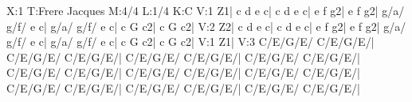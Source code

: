 X:1
T:Frere Jacques
M:4/4
L:1/4
K:C
V:1
Z1|
c d e c| c d e c| e f g2| e f g2| g/a/ g/f/ e c| g/a/ g/f/ e c|
c G c2| c G c2|
V:2
Z2|
c d e c| c d e c| e f g2| e f g2| g/a/ g/f/ e c| g/a/ g/f/ e c|
c G c2| c G c2|
V:1
Z1| 
V:3
C/E/G/E/ C/E/G/E/|
C/E/G/E/ C/E/G/E/|
C/E/G/E/ C/E/G/E/|
C/E/G/E/ C/E/G/E/|
C/E/G/E/ C/E/G/E/|
C/E/G/E/ C/E/G/E/|
C/E/G/E/ C/E/G/E/|
C/E/G/E/ C/E/G/E/|
C/E/G/E/ C/E/G/E/|
C/E/G/E/ C/E/G/E/|
